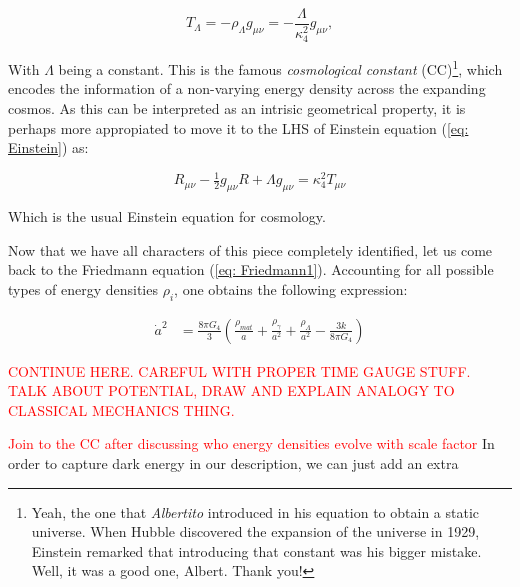 \documentclass[11pt, a4paper]{article} %
\begin{document}
\begin{equation}
	T_{\Lambda} = - \rho_{\Lambda}g_{\mu\nu} = - \frac{\Lambda}{\kappa^{2}_{4}} g_{\mu\nu},
\end{equation}

With $\Lambda$ being a constant. This is the famous \textit{cosmological constant} (CC)\footnote{Yeah, the one that \textit{Albertito} introduced in his equation to obtain a static universe. When Hubble discovered the expansion of the universe in 1929, Einstein remarked that introducing that constant was his bigger mistake. Well, it was a good one, Albert. Thank you!}, which encodes the information of a non-varying energy density across the expanding cosmos. As this can be interpreted as an intrisic geometrical property, it is perhaps more appropiated to move it to the LHS of Einstein equation (\ref{eq: Einstein}) as: 

\begin{equation}\label{eq: Einstein with Lambda}
	R_{\mu\nu} - \tfrac{1}{2} g_{\mu\nu} R + \Lambda g_{\mu\nu}  = \kappa^{2}_{4} T_{\mu \nu}
\end{equation}

Which is the usual Einstein equation for cosmology. 

Now that we have all characters of this piece completely identified, let us come back to the Friedmann equation (\ref{eq: Friedmann1}). Accounting for all possible types of energy densities $\rho_{i}$, one obtains the following expression:

\begin{equation}
	\begin{split}
		\dot{a}^{2} &= \frac{8 \pi G_{4}}{3} \left(\frac{\rho_{mat}}{a} + \frac{\rho_{\gamma}}{a^{2}} + \frac{\rho_{\Lambda}}{a^{2}}- \frac{3 k}{8 \pi G_{4}}\right)
	\end{split}
\end{equation}

\textcolor{red}{CONTINUE HERE. CAREFUL WITH PROPER TIME GAUGE STUFF. TALK ABOUT POTENTIAL, DRAW AND EXPLAIN ANALOGY TO CLASSICAL MECHANICS THING.}


\textcolor{red}{Join to the CC after discussing who energy densities evolve with scale factor}
In order to capture dark energy in our description, we can just add an extra 







\cite{Danielsson:2018ztv}







\end{document}
